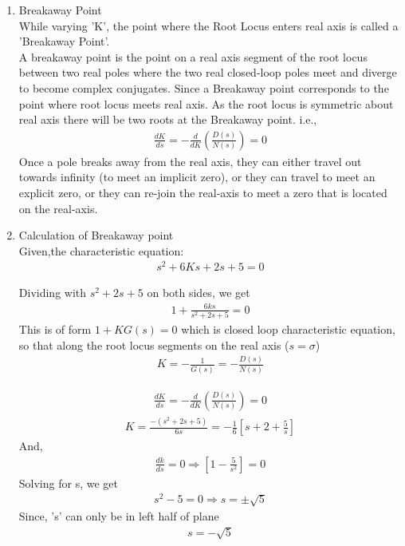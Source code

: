 \begin{enumerate}[label=\thesection.\arabic*.,ref=\thesection.\theenumi]
\item Breakaway Point \\
    While varying 'K', the point where the Root Locus enters real axis is called a 'Breakaway Point'. \\
A breakaway point is the point on a real axis segment of the root locus between two real poles where the two real closed-loop poles meet and diverge to become complex conjugates. Since a Breakaway point corresponds to the point where root locus meets real axis. As the root locus is symmetric about real axis there will be two roots at the Breakaway point. 
i.e.,
    \begin{align}
        \frac{d K}{d s}=-\frac{d}{d K}\left(\frac{D(s)}{N(s)}\right)=0 
    \end{align}
    Once a pole breaks away from the real axis, they can either travel out towards infinity (to meet an implicit zero), or they can travel to meet an explicit zero, or they can re-join the real-axis to meet a zero that is located on the real-axis. 

\item Calculation of Breakaway point \\

Given,the characteristic equation:
    \begin{align}
        s^2 + 6Ks + 2s + 5 = 0    
    \end{align}
    
    Dividing with $s^2 + 2s + 5$ on both sides, we get
    \begin{align}
        1+\frac{6 k s}{s^{2}+2 s+5}=0    
    \end{align}
    This is of form $1+KG(s)=0$ which is closed loop characteristic equation, so that along the root locus
    segments on the real axis ($s = \sigma$)
    \begin{align}
        K=-\frac{1}{G(s)}=-\frac{D(s)}{N(s)}    
    \end{align}

    \begin{align}
        \frac{d K}{d s}=-\frac{d}{d K}\left(\frac{D(s)}{N(s)}\right)=0    
    \end{align}
    \begin{align}
        K=\frac{-\left(s^{2}+2 s+5\right)}{6 s}=-\frac{1}{6}\left[s+2+\frac{5}{s}\right]    
    \end{align}
    And,
    \begin{align}
        \frac{d k}{d s}=0 \Rightarrow\left[1-\frac{5}{s^{2}}\right]=0 
    \end{align}
    Solving for s, we get
    \begin{align}
        s^{2}-5=0 \Rightarrow s=\pm \sqrt{5}    
    \end{align}
    Since, 's' can only be in left half of plane
    \begin{align}
        \boxed{s=-\sqrt{5}}    
    \end{align}
    

\end{enumerate}
